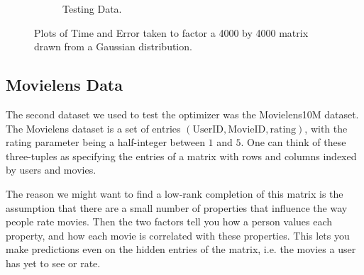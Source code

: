 \begin{figure}
\begin{subfigure}[b]{.45\textwidth}
\begin{center}
		\caption{Testing Data.}
\end{center}
	\end{subfigure}
\hfill
	\caption{Plots of Time and Error taken to factor a 4000 by 4000 matrix drawn from a Gaussian distribution.}	
\end{figure}

\subsection{Movielens Data}
The second dataset we used to test the optimizer was the Movielens10M dataset. The Movielens dataset is a set of entries $(\text{UserID},\text{MovieID},\text{rating})$, with the rating parameter being a half-integer between $1$ and $5$. One can think of these three-tuples as specifying the entries of a matrix with rows and columns indexed by users and movies. 

The reason we might want to find a low-rank completion of this matrix is the assumption that there are a small number of properties that influence the way people rate movies. Then the two factors tell you how a person values each property, and how each movie is correlated with these properties. This lets you make predictions even on the hidden entries of the matrix, i.e. the movies a user has yet to see or rate. 

